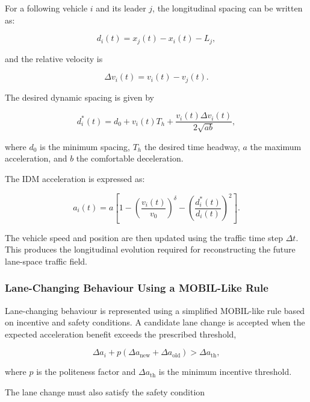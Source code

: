 \documentclass[journal]{IEEEtran}
\begin{document}
For a following vehicle $i$ and its leader $j$, the longitudinal spacing can be written as:

\begin{equation}
d_i(t)
=
x_j(t)-x_i(t)-L_j,
\end{equation}

and the relative velocity is

\begin{equation}
\Delta v_i(t)
=
v_i(t)-v_j(t).
\end{equation}

The desired dynamic spacing is given by

\begin{equation}
d_i^{*}(t)
=
d_0
+
v_i(t)T_h
+
\frac{
v_i(t)\Delta v_i(t)
}{
2\sqrt{ab}
},
\end{equation}

where $d_0$ is the minimum spacing, $T_h$ the desired time headway, $a$ the maximum acceleration, and $b$ the comfortable deceleration.

The IDM acceleration is expressed as:

\begin{equation}
a_i(t)
=
a
\left[
1
-
\left(
\frac{v_i(t)}{v_0}
\right)^{\delta}
-
\left(
\frac{d_i^{*}(t)}{d_i(t)}
\right)^2
\right].
\end{equation}

The vehicle speed and position are then updated using the traffic time step $\Delta t$. This produces the longitudinal evolution required for reconstructing the future lane-space traffic field.


\subsubsection{Lane-Changing Behaviour Using a MOBIL-Like Rule}

Lane-changing behaviour is represented using a simplified MOBIL-like rule based on incentive and safety conditions. A candidate lane change is accepted when the expected acceleration benefit exceeds the prescribed threshold,

\begin{equation}
\Delta a_i
+
p
\left(
\Delta a_{\mathrm{new}}
+
\Delta a_{\mathrm{old}}
\right)
>
\Delta a_{\mathrm{th}},
\end{equation}

where $p$ is the politeness factor and $\Delta a_{\mathrm{th}}$ is the minimum incentive threshold.

The lane change must also satisfy the safety condition
\end{document}
